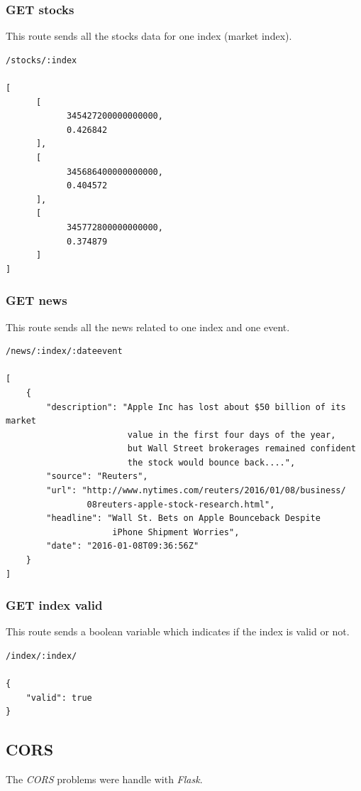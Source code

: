 \subsubsection*{GET stocks}
This route sends all the stocks data for one index (market index).
\begin{verbatim}
/stocks/:index

[
      [
            345427200000000000,
            0.426842
      ],
      [
            345686400000000000,
            0.404572
      ],
      [
            345772800000000000,
            0.374879
      ]
]
\end{verbatim}

\subsubsection*{GET news}
This route sends all the news related to one index and one event.
\begin{verbatim}
/news/:index/:dateevent

[
    {
        "description": "Apple Inc has lost about $50 billion of its market
                        value in the first four days of the year,
                        but Wall Street brokerages remained confident
                        the stock would bounce back....",
        "source": "Reuters",
        "url": "http://www.nytimes.com/reuters/2016/01/08/business/
                08reuters-apple-stock-research.html",
        "headline": "Wall St. Bets on Apple Bounceback Despite
                     iPhone Shipment Worries",
        "date": "2016-01-08T09:36:56Z"
    }
]
\end{verbatim}

\subsubsection*{GET index valid}
This route sends a boolean variable which indicates if the index is valid or not.
\begin{verbatim}
/index/:index/

{
    "valid": true
}
\end{verbatim}
\subsection{CORS}

The \textit{CORS} problems were handle with \textit{Flask}.

